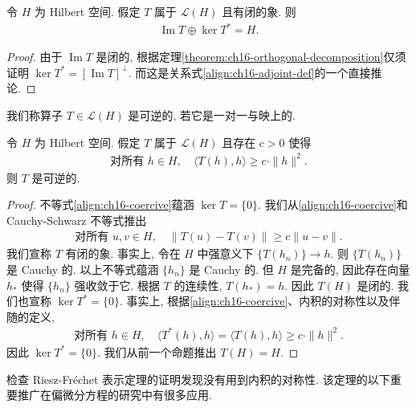 \documentclass[../../main.tex]{subfiles}
\begin{document}
\begin{proposition}\label{proposition:ch16-kernel-orth}
令 $H$ 为 Hilbert 空间. 假定 $T$ 属于 $\mathcal{L}(H)$ 且有闭的象. 则
\begin{align}
\operatorname{Im}T\oplus\ker T^{*}=H.\label{align:ch16-kernel-orth}
\end{align}
\end{proposition}

\begin{proof}
由于 $\operatorname{Im}T$ 是闭的, 根据定理\cref{theorem:ch16-orthogonal-decomposition}仅须证明 $\ker T^{*}=[\operatorname{Im}T]^{\perp}$. 而这是关系式\eqref{align:ch16-adjoint-def}的一个直接推论.
\end{proof}

我们称算子 $T\in\mathcal{L}(H)$ 是可逆的, 若它是一对一与映上的.

\begin{proposition}\label{proposition:ch16-coercive-invertible}
令 $H$ 为 Hilbert 空间. 假定 $T$ 属于 $\mathcal{L}(H)$ 且存在 $c>0$ 使得
\begin{align}
\text{对所有 }h\in H,\quad\langle T(h),h\rangle\geqslant c\cdot\|h\|^{2}.\label{align:ch16-coercive}
\end{align}
则 $T$ 是可逆的.
\end{proposition}

\begin{proof}
不等式\eqref{align:ch16-coercive}蕴涵 $\ker T=\{0\}$. 我们从\eqref{align:ch16-coercive}和 Cauchy-Schwarz 不等式推出
\begin{align*}
\text{对所有 }u,v\in H,\quad\|T(u)-T(v)\|\geqslant c\|u-v\|.
\end{align*}
我们宣称 $T$ 有闭的象. 事实上, 令在 $H$ 中强意义下 $\{T(h_{n})\}\to h$. 则 $\{T(h_{n})\}$ 是 Cauchy 的. 以上不等式蕴涵 $\{h_{n}\}$ 是 Cauchy 的. 但 $H$ 是完备的, 因此存在向量 $h_{*}$ 使得 $\{h_{n}\}$ 强收敛于它. 根据 $T$ 的连续性, $T(h_{*})=h$. 因此 $T(H)$ 是闭的. 我们也宣称 $\ker T^{*}=\{0\}$. 事实上, 根据\eqref{align:ch16-coercive}、内积的对称性以及伴随的定义,
\begin{align*}
\text{对所有 }h\in H,\quad\langle T^{*}(h),h\rangle=\langle T(h),h\rangle\geqslant c\cdot\|h\|^{2}.
\end{align*}
因此 $\ker T^{*}=\{0\}$. 我们从前一个命题推出 $T(H)=H$.
\end{proof}

检查 Riesz-Fr\'echet 表示定理的证明发现没有用到内积的对称性. 该定理的以下重要推广在偏微分方程的研究中有很多应用.
\end{document}
